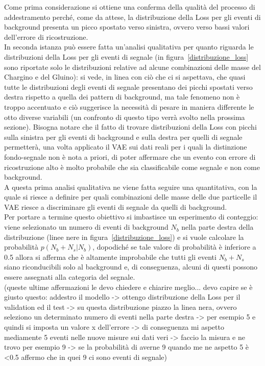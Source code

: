 Come prima considerazione si ottiene una conferma della qualità del processo di addestramento perché, come da attese, la distribuzione della Loss per gli eventi di background presenta un picco spostato verso sinistra, ovvero verso bassi valori dell'errore di ricostruzione. \\ 
In seconda istanza può essere fatta un'analisi qualitativa per quanto riguarda le distribuzioni della Loss per gli eventi di segnale (in figura~\ref{distribuzione_loss} sono riportate solo le distribuzioni relative ad alcune combinazioni delle masse del Chargino e del Gluino): si vede, in linea con ciò che ci si aspettava, che quasi tutte le distribuzioni degli eventi di segnale presentano dei picchi spostati verso destra rispetto a quella dei pattern di background, ma tale fenomeno non è troppo accentuato e ciò suggerisce la necessità di pesare in maniera differente le otto diverse variabili (un confronto di questo tipo verrà svolto nella prossima sezione). Bisogna notare che il fatto di trovare distribuzioni della Loss con picchi sulla sinistra per gli eventi di background e sulla destra per quelli di segnale permetterà, una volta applicato il VAE sui dati reali per i quali la distinzione fondo-segnale non è nota a priori, di poter affermare che un evento con errore di ricostruzione alto è molto probabile che sia classificabile come segnale e non come background. \\
A questa prima analisi qualitativa ne viene fatta seguire una quantitativa, con la quale si riesce a definire per quali combinazioni delle masse delle due particelle il VAE riesce a discriminare gli eventi di segnale da quelli di background.\\
Per portare a termine questo obiettivo si imbastisce un esperimento di conteggio: viene selezionato un numero di eventi di background $N_b$ nella parte destra della distribuzione (linee nere in figura~\ref{distribuzione_loss}) e si vuole calcolare la probabilità $p(N_b + N_s|N_b)$, dopodiché se tale valore di probabilità è inferiore a 0.5 allora si afferma che è altamente improbabile che tutti gli eventi $N_b + N_s$ siano riconducibili solo al background e, di conseguenza, alcuni di questi possono essere assegnati alla categoria del segnale. \\


\color{red} (queste ultime affermazioni le devo chiedere e chiarire meglio... devo capire se è giusto questo: addestro il modello -> ottengo distribuzione della Loss per il validation ed il test -> su questa distribuzione piazzo la linea nera, ovvero seleziono un determinato numero di eventi nella parte destra -> per esempio 5 e quindi si imposta un valore x dell'errore -> di conseguenza mi aspetto mediamente 5 eventi nelle nuove misure sui dati veri -> faccio la misura e ne trovo per esempio 9 -> se la probabilità di averne 9 quando me ne aspetto 5 è <0.5 affermo che in quei 9 ci sono eventi di segnale)
\color{black} 

